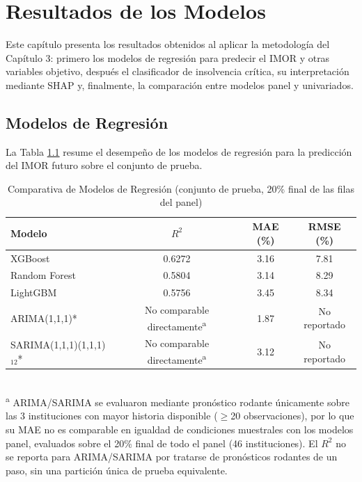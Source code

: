 \chapter{Resultados de los Modelos}

Este capítulo presenta los resultados obtenidos al aplicar la metodología del Capítulo 3: primero los modelos de regresión para predecir el IMOR y otras variables objetivo, después el clasificador de insolvencia crítica, su interpretación mediante SHAP y, finalmente, la comparación entre modelos panel y univariados.

\section{Modelos de Regresión}
La Tabla \ref{tab:comparativa_regresion} resume el desempeño de los modelos de regresión para la predicción del IMOR futuro sobre el conjunto de prueba.
\begin{table}[H]
\centering
\caption{Comparativa de Modelos de Regresión (conjunto de prueba, 20\% final de las filas del panel)}
\label{tab:comparativa_regresion}
\begin{tabular}{lccc}
\toprule
\textbf{Modelo} & $R^2$ & \textbf{MAE (\%)} & \textbf{RMSE (\%)} \\
\midrule
XGBoost & 0.6272 & 3.16 & 7.81 \\
Random Forest & 0.5804 & 3.14 & 8.29 \\
LightGBM & 0.5756 & 3.45 & 8.34 \\
ARIMA(1,1,1)* & No comparable directamente\textsuperscript{a} & 1.87 & No reportado \\
SARIMA(1,1,1)(1,1,1)$_{12}$* & No comparable directamente\textsuperscript{a} & 3.12 & No reportado \\
\bottomrule
\end{tabular}
\\[0.2cm]
\footnotesize\textsuperscript{a} ARIMA/SARIMA se evaluaron mediante pronóstico rodante únicamente sobre las 3 instituciones con mayor historia disponible ($\geq$20 observaciones), por lo que su MAE no es comparable en igualdad de condiciones muestrales con los modelos panel, evaluados sobre el 20\% final de todo el panel (46 instituciones). El $R^2$ no se reporta para ARIMA/SARIMA por tratarse de pronósticos rodantes de un paso, sin una partición única de prueba equivalente.
\end{table}

